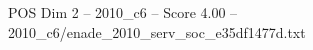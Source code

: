 \begin{textsample}{POS Dim 2 – 2010\_c6 – Score 4.00 – 2010\_c6/enade\_2010\_serv\_soc\_e35df1477d.txt}
\end{textsample}
